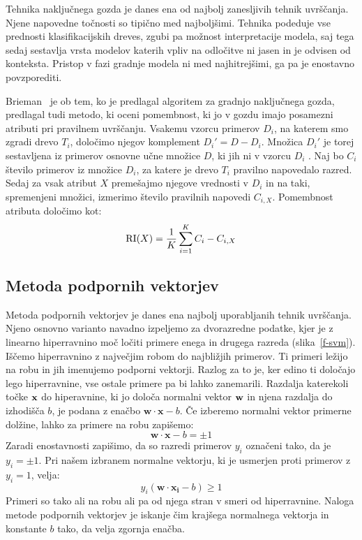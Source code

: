 Tehnika naključnega gozda je danes ena od najbolj zanesljivih tehnik uvrščanja. Njene napovedne točnosti so tipično med najboljšimi. Tehnika podeduje vse prednosti klasifikacijskih dreves, zgubi pa možnost interpretacije modela, saj tega sedaj sestavlja vrsta modelov katerih vpliv na odločitve ni jasen in je odvisen od konteksta. Pristop v fazi gradnje modela ni med najhitrejšimi, ga pa je enostavno povzporediti.

Brieman~\cite{} je ob tem, ko je predlagal algoritem za gradnjo naključnega gozda, predlagal tudi metodo, ki oceni pomembnost, ki jo v gozdu imajo posamezni atributi pri pravilnem uvrščanju. Vsakemu vzorcu primerov $D_i$, na katerem smo zgradi drevo $T_i$,  določimo njegov komplement $D_i'=D-D_i$. Množica $D_i'$ je torej sestavljena iz primerov osnovne učne množice $D$, ki jih ni v vzorcu $D_i$ . Naj bo $C_i$ število primerov iz množice $D_i$, za katere je drevo $T_i$ pravilno napovedalo razred. Sedaj za vsak atribut $X$ premešajmo njegove vrednosti v $D_i$ in na taki, spremenjeni množici, izmerimo število pravilnih napovedi $C_{i,X}$. Pomembnost  atributa določimo kot:
%
$$ {\rm RI}(X)= {1\over K}\sum_{i=1}^K{C_i - C_{i,X}} $$

\subsection{Metoda podpornih vektorjev}

Metoda podpornih vektorjev je danes ena najbolj uporabljanih tehnik uvrščanja. Njeno osnovno varianto navadno izpeljemo za dvorazredne podatke, kjer je z linearno hiperravnino moč ločiti primere enega in drugega razreda (slika~\ref{f-svm}). Iščemo hiperravnino z največjim robom  do najbližjih primerov. Ti primeri ležijo na robu in jih imenujemo podporni vektorji. Razlog za to je, ker edino ti določajo lego hiperravnine, vse ostale primere pa bi lahko zanemarili. Razdalja katerekoli točke ${\bf x}$ do hiperavnine, ki jo določa normalni vektor ${\bf w}$ in njena razdalja do izhodišča $b$, je podana z enačbo $\mathbf{w}\cdot\mathbf{x} - b$. Če izberemo normalni vektor primerne dolžine, lahko za primere na robu zapišemo:
%
$$\mathbf{w}\cdot\mathbf{x} - b=\pm1$$
%
Zaradi enostavnosti zapišimo, da so razredi primerov $y_i$ označeni tako, da je $y_i=\pm 1$. Pri našem izbranem normalne vektorju, ki je usmerjen proti primerov z $y_i=1$, velja:
%
$$y_i(\mathbf{w}\cdot\mathbf{x_i} - b)\geq 1$$
%
Primeri so tako ali na robu ali pa od njega stran v smeri od hiperravnine. Naloga metode podpornih vektorjev je iskanje čim krajšega normalnega vektorja in konstante $b$ tako, da velja zgornja enačba.

